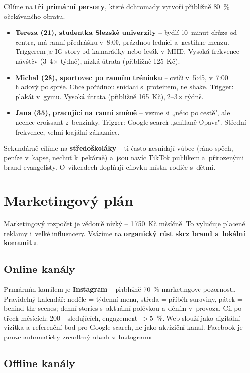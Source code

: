 \documentclass[12pt,a4paper]{article}
\begin{document}
Cílíme na \textbf{tři primární persony}, které dohromady vytvoří přibližně 80~\% očekávaného obratu.

\begin{itemize}
  \item \textbf{Tereza (21), studentka Slezské univerzity} -- bydlí 10~minut chůze od centra, má ranní přednášku v~8:00, prázdnou lednici a~nestihne menzu. Triggerem je IG story od kamarádky nebo leták v~MHD. Vysoká frekvence návštěv (3--4× týdně), nízká útrata (přibližně 125~Kč).
  \item \textbf{Michal (28), sportovec po ranním tréninku} -- cvičí v~5:45, v~7:00 hladový po sprše. Chce pořádnou snídani s~proteinem, ne shake. Trigger: plakát v~gymu. Vysoká útrata (přibližně 165~Kč), 2--3× týdně.
  \item \textbf{Jana (35), pracující na ranní směně} -- vezme si „něco po cestě", ale nechce croissant z~benzínky. Trigger: Google search „snídaně Opava". Střední frekvence, velmi loajální zákaznice.
\end{itemize}

Sekundárně cílíme na \textbf{středoškoláky} -- ti často nesnídají vůbec (ráno spěch, peníze v~kapse, nechuť k~pekárně) a~jsou navíc TikTok publikem a~přirozenými brand evangelisty. O~víkendech doplňují cílovku místní rodiče s~dětmi.

\section{Marketingový plán}

Marketingový rozpočet je vědomě nízký -- 1\,750~Kč měsíčně. To vylučuje placené reklamy i~velké influencery. Vsázíme na \textbf{organický růst skrz brand a~lokální komunitu}.

\subsection{Online kanály}

Primárním kanálem je \textbf{Instagram} -- přibližně 70~\% marketingové pozornosti. Pravidelný kalendář: neděle = týdenní menu, středa = příběh suroviny, pátek = behind-the-scenes; denní stories s~aktuální polévkou a~děním v~provozu. Cíl po třech měsících: 200+ sledujících, engagement~$>5$~\%. Web slouží jako digitální vizitka a~referenční bod pro Google search, ne jako akviziční kanál. Facebook je pouze automaticky zrcadlený obsah z~Instagramu.

\subsection{Offline kanály}
\end{document}
